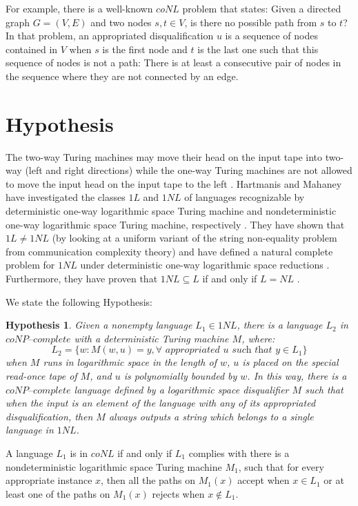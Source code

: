 \documentclass[a4paper,UKenglish,cleveref, autoref]{lipics-v2019}
\newtheorem{hypothesis}[theorem]{Hypothesis}
\begin{document}
For example, there is a well-known $coNL$ problem that states: Given a directed graph $G = (V, E)$ and two nodes $s, t \in V$, is there no possible path from $s$ to $t$? In that problem, an appropriated disqualification $u$ is a sequence of nodes contained in $V$ when $s$ is the first node and $t$ is the last one such that this sequence of nodes is not a path: There is at least a consecutive pair of nodes in the sequence where they are not connected by an edge.

\section{Hypothesis}

The two-way Turing machines may move their head on the input tape into two-way (left and right directions) while the one-way Turing machines are not allowed to move the input head on the input tape to the left \cite{KU15}. Hartmanis and Mahaney have investigated the classes $1L$ and $1NL$ of languages recognizable by deterministic one-way logarithmic space Turing machine and nondeterministic one-way logarithmic space Turing machine, respectively \cite{HM81}. They have shown that $1L \neq 1NL$ (by looking at a uniform variant of the string non-equality problem from communication complexity theory) and have defined a natural complete problem for $1NL$ under deterministic one-way logarithmic space reductions \cite{HM81}. Furthermore, they have proven that $1NL \subseteq L$ if and only if $L=NL$ \cite{HM81}.

We state the following Hypothesis:

\begin{hypothesis}
\label{hypothesis2}
Given a nonempty language $L_{1} \in 1NL$, there is a language $L_{2}$ in $\textit{coNP--complete}$ with a deterministic Turing machine $M$, where:
\[L_{2} = \{w: M(w, u) = y, \forall \textit{ appropriated } u \textit{ such that } y \in L_{1}\}\]
when $M$ runs in logarithmic space in the length of $w$, $u$ is placed on the special read-once tape of $M$, and $u$ is polynomially bounded by $w$. In this way, there is a $\textit{coNP--complete}$ language defined by a logarithmic space disqualifier $M$ such that when the input is an element of the language with any of its appropriated disqualification, then $M$ always outputs a string which belongs to a single language in $1NL$.
\end{hypothesis}

\begin{theorem}
\label{coNL}
A language $L_{1}$ is in $coNL$ if and only if $L_{1}$ complies with there is a nondeterministic logarithmic space Turing machine $M_{1}$, such that for every appropriate instance $x$, then all the paths on $M_{1}(x)$ accept when $x \in L_{1}$ or at least one of the paths on $M_{1}(x)$ rejects when $x \notin L_{1}$.
\end{theorem}
\end{document}
